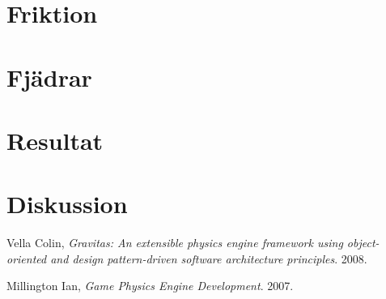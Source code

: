 \documentclass[a4paper,12pt,twocolumn,swedish]{article}
\begin{document}
\section{Friktion}
\blindtext[1]
\section{Fjädrar}
\blindtext[1]
\section{Resultat}
\blindtext[1]
\section{Diskussion}
\blindtext[1]
\clearpage
\begin{thebibliography}{9}

  Vella Colin,
  \emph{Gravitas: An extensible physics engine framework using object-oriented and design pattern-driven software architecture principles}.
  2008.

  Millington Ian,
  \emph{Game Physics Engine Development}.
  2007.

\end{thebibliography}
\end{document}
